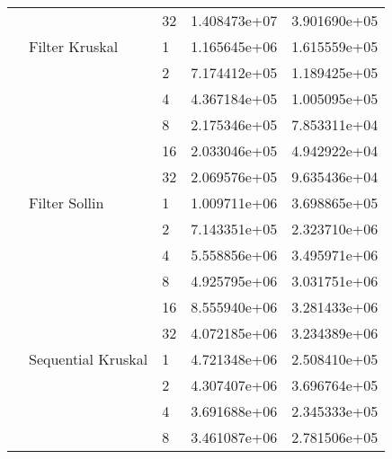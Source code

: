 \begin{tabular}{lllrr}
                                                       &                     & 32 &  1.408473e+07 &  3.901690e+05 \\
                                                       & Filter Kruskal & 1  &  1.165645e+06 &  1.615559e+05 \\
                                                       &                     & 2  &  7.174412e+05 &  1.189425e+05 \\
                                                       &                     & 4  &  4.367184e+05 &  1.005095e+05 \\
                                                       &                     & 8  &  2.175346e+05 &  7.853311e+04 \\
                                                       &                     & 16 &  2.033046e+05 &  4.942922e+04 \\
                                                       &                     & 32 &  2.069576e+05 &  9.635436e+04 \\
                                                       & Filter Sollin & 1  &  1.009711e+06 &  3.698865e+05 \\
                                                       &                     & 2  &  7.143351e+05 &  2.323710e+06 \\
                                                       &                     & 4  &  5.558856e+06 &  3.495971e+06 \\
                                                       &                     & 8  &  4.925795e+06 &  3.031751e+06 \\
                                                       &                     & 16 &  8.555940e+06 &  3.281433e+06 \\
                                                       &                     & 32 &  4.072185e+06 &  3.234389e+06 \\
                                                       & Sequential Kruskal & 1  &  4.721348e+06 &  2.508410e+05 \\
                                                       &                     & 2  &  4.307407e+06 &  3.696764e+05 \\
                                                       &                     & 4  &  3.691688e+06 &  2.345333e+05 \\
                                                       &                     & 8  &  3.461087e+06 &  2.781506e+05 \\

\end{tabular}
